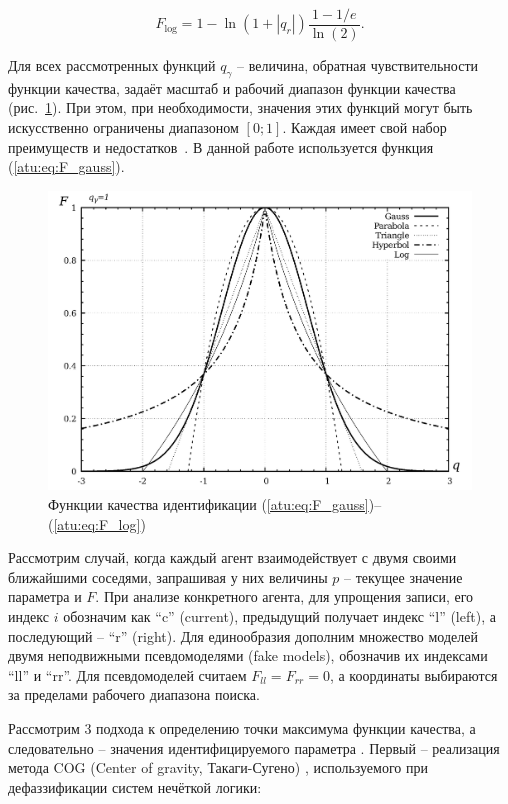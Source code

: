 \documentclass[a4paper,paratype,12pt,fouriernc]{cmonogra}
\begin{document}
\begin{equation}
  F_{\mathrm{log}} = 1 - \ln \left( 1 + |q_r| \right) \frac{1-1/e}{\ln(2)}.
\label{atu:eq:F_log}
\end{equation}

Для всех рассмотренных функций $q_\gamma$ -- величина, обратная чувствительности
функции качества, задаёт масштаб и рабочий диапазон функции качества (рис.~\ref{atu:f:F_types}).
При этом, при необходимости, значения этих функций могут быть искусственно ограничены диапазоном $[0;1]$.
Каждая имеет свой набор преимуществ и недостатков~\cite{atu_ISDMCI2016}. В данной работе используется
функция (\ref{atu:eq:F_gauss}).

\begin{figure}[htb!]
  \centerline{\includegraphics[width=45\TW]{p/F_types.png} }
  \caption{Функции качества идентификации (\ref{atu:eq:F_gauss})--(\ref{atu:eq:F_log})}
  \label{atu:f:F_types}
\end{figure}

Рассмотрим случай, когда каждый агент взаимодействует с двумя своими ближайшими соседями,
запрашивая у них величины $p$ -- текущее значение параметра и $F$.
При анализе конкретного агента, для упрощения записи, его индекс $i$ обозначим как ``c'' (current),
предыдущий получает индекс ``l'' (left), а последующий -- ``r'' (right).
Для единообразия дополним множество моделей двумя неподвижными псевдомоделями (fake models),
обозначив их индексами ``ll'' и ``rr''. Для псевдомоделей считаем $  F_{ll} = F_{rr} = 0$,
а координаты выбираются за пределами рабочего диапазона поиска.


Рассмотрим 3 подхода к определению
точки максимума функции качества, а следовательно -- значения идентифицируемого параметра \cite{atu_st99,atu_jacs2015}.
Первый -- реализация
метода COG (Center of gravity, Такаги-Сугено) \cite{atu_asau25,atu_csit2015},
используемого при дефаззификации систем нечёткой логики:
\end{document}
